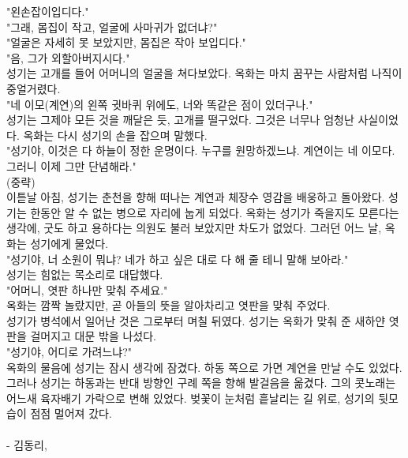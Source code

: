 \documentclass[10pt,a4paper]{article}
\begin{document}
\begin{tcolorbox}[passage]
"왼손잡이입디다." \\{}
"그래, 몸집이 작고, 얼굴에 사마귀가 없더냐?" \\{}
"얼굴은 자세히 못 보았지만, 몸집은 작아 보입디다." \\{}
"음, 그가 외할아버지시다." \\{}
성기는 고개를 들어 어머니의 얼굴을 쳐다보았다. 옥화는 마치 꿈꾸는 사람처럼 나직이 중얼거렸다. \\{}
"네 이모(계연)의 왼쪽 귓바퀴 위에도, 너와 똑같은 점이 있더구나." \\{}
성기는 그제야 모든 것을 깨달은 듯, 고개를 떨구었다. 그것은 너무나 엄청난 사실이었다. 옥화는 다시 성기의 손을 잡으며 말했다. \\{}
"성기야, 이것은 다 하늘이 정한 운명이다. 누구를 원망하겠느냐. 계연이는 네 이모다. 그러니 이제 그만 단념해라." \\{}
(중략) \\{}
이튿날 아침, 성기는 춘천을 향해 떠나는 계연과 체장수 영감을 배웅하고 돌아왔다. 성기는 한동안 알 수 없는 병으로 자리에 눕게 되었다. 옥화는 성기가 죽을지도 모른다는 생각에, 굿도 하고 용하다는 의원도 불러 보았지만 차도가 없었다. 그러던 어느 날, 옥화는 성기에게 물었다. \\{}
"성기야, 너 소원이 뭐냐? 네가 하고 싶은 대로 다 해 줄 테니 말해 보아라." \\{}
성기는 힘없는 목소리로 대답했다. \\{}
"어머니, 엿판 하나만 맞춰 주세요." \\{}
옥화는 깜짝 놀랐지만, 곧 아들의 뜻을 알아차리고 엿판을 맞춰 주었다. \\{}
성기가 병석에서 일어난 것은 그로부터 며칠 뒤였다. 성기는 옥화가 맞춰 준 새하얀 엿판을 걸머지고 대문 밖을 나섰다.  \\{}
"성기야, 어디로 가려느냐?" \\{}
옥화의 물음에 성기는 잠시 생각에 잠겼다. 하동 쪽으로 가면 계연을 만날 수도 있었다. 그러나 성기는 하동과는 반대 방향인 구례 쪽을 향해 발걸음을 옮겼다. 그의 콧노래는 어느새 육자배기 가락으로 변해 있었다. 벚꽃이 눈처럼 흩날리는 길 위로, 성기의 뒷모습이 점점 멀어져 갔다. \\{}
\vspace{4pt} \\{}
- 김동리,
\end{tcolorbox}
\vspace{3mm}
\end{document}
